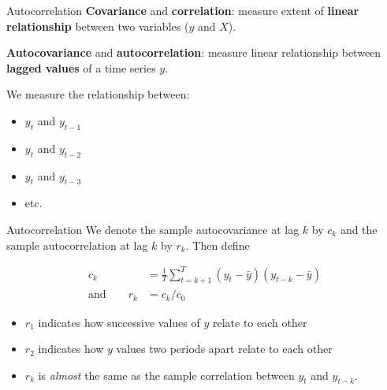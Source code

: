\documentclass[14pt,ignorenonframetext,aspectratio=169]{beamer}
\providecommand{\tightlist}{%
  \setlength{\itemsep}{0pt}\setlength{\parskip}{0pt}}
\begin{document}
\begin{frame}{Autocorrelation}
\protect\hypertarget{autocorrelation}{}
\textbf{Covariance} and \textbf{correlation}: measure extent of
\textbf{linear relationship} between two variables (\(y\) and
\(X\)).\pause

\textbf{Autocovariance} and \textbf{autocorrelation}: measure linear
relationship between \textbf{lagged values} of a time series
\(y\).\pause

We measure the relationship between:

\begin{itemize}
\tightlist
\item
  \(y_{t}\) and \(y_{t-1}\)
\item
  \(y_{t}\) and \(y_{t-2}\)
\item
  \(y_{t}\) and \(y_{t-3}\)
\item
  etc.
\end{itemize}
\end{frame}

\begin{frame}{Autocorrelation}
\protect\hypertarget{autocorrelation-1}{}
We denote the sample autocovariance at lag \(k\) by \(c_k\) and the
sample autocorrelation at lag \(k\) by \(r_k\). Then define

\begin{block}{}
\begin{align*}
c_k &= \frac{1}{T}\sum_{t=k+1}^T (y_t-\bar{y})(y_{t-k}-\bar{y}) \\[0.cm]
\text{and}\qquad
r_{k} &= c_k/c_0
\end{align*}
\end{block}\pause\small

\begin{itemize}
\tightlist
\item
  \(r_1\) indicates how successive values of \(y\) relate to each other
\item
  \(r_2\) indicates how \(y\) values two periods apart relate to each
  other
\item
  \(r_k\) is \textit{almost} the same as the sample correlation between
  \(y_t\) and \(y_{t-k}\).
\end{itemize}
\end{frame}
\end{document}
